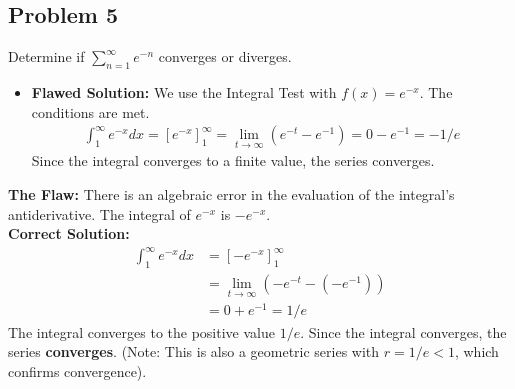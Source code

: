 \documentclass{article}
\begin{document}
\subsection*{Problem 5}
Determine if $\sum_{n=1}^\infty e^{-n}$ converges or diverges.
\begin{itemize}
    \item \textbf{Flawed Solution:} We use the Integral Test with $f(x) = e^{-x}$. The conditions are met.
    \begin{align*}
    \int_1^\infty e^{-x} dx = [e^{-x}]_1^\infty = \lim_{t\to\infty} (e^{-t} - e^{-1}) = 0 - e^{-1} = -1/e
    \end{align*}
    Since the integral converges to a finite value, the series converges.
\end{itemize}
\textbf{The Flaw:} There is an algebraic error in the evaluation of the integral's antiderivative. The integral of $e^{-x}$ is $-e^{-x}$. \\
\textbf{Correct Solution:}
\begin{align*}
    \int_1^\infty e^{-x} dx &= [-e^{-x}]_1^\infty \\
    &= \lim_{t\to\infty} (-e^{-t} - (-e^{-1})) \\
    &= 0 + e^{-1} = 1/e
\end{align*}
The integral converges to the positive value $1/e$. Since the integral converges, the series \textbf{converges}. (Note: This is also a geometric series with $r=1/e < 1$, which confirms convergence).
\end{document}
